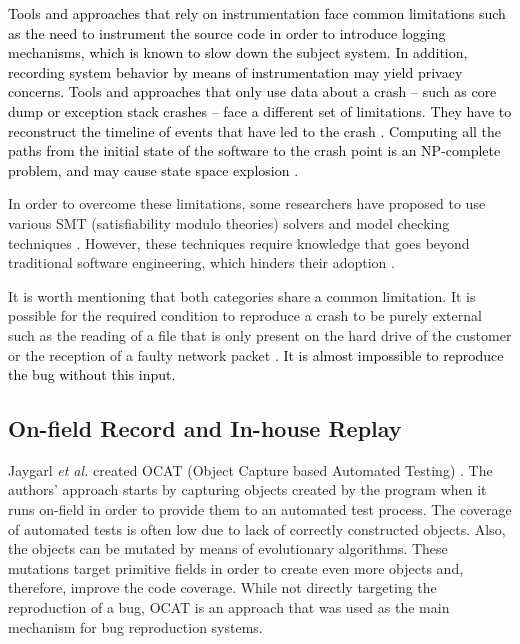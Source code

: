 \documentclass[times, doublespace]{smrauth}
\newcommand{\red}[1]{\textcolor{black}{#1}}
\begin{document}
\red{Tools and approaches that rely on instrumentation face common limitations such as the need to instrument the source code in order to introduce logging mechanisms\cite{Narayanasamy2005,Jaygarl,Artzi2008}, which is known to slow down the subject system.
In addition,  recording system behavior by means of instrumentation may yield privacy concerns.
Tools and approaches that only use data about a crash -- such as core dump or exception stack crashes -- face a different set of limitations. They have to reconstruct the timeline of events that have led to the crash \cite{Chen2013a,Nayrolles2015}. Computing all the paths from the initial state of the software to the crash point is an NP-complete problem, and may cause state space explosion \cite{Chen2013a,Clause2007}.}

In order to overcome these limitations, some researchers have proposed to
use various SMT (satisfiability modulo theories) solvers \cite{Dutertre2006}
and model checking techniques \cite{Visser2003}.
However, these techniques require knowledge that goes beyond traditional
software engineering, which hinders their adoption  \cite{Visser2004}.

It is worth mentioning that both categories share a common limitation.
It is possible for the required condition to reproduce a crash to be purely
external such as the reading of a file that is only present on the hard
drive of the customer or the reception of a faulty network packet
\cite{Chen2013a, Nayrolles2015}.
\red{It is almost impossible to reproduce the bug without this input.}



\subsection{On-field Record and In-house Replay}

Jaygarl {\it et al.} created OCAT (Object Capture based Automated Testing)
\cite{Jaygarl}.
The authors' approach starts by capturing objects created by the program when
it runs on-field in order to provide them to an automated test process.
The coverage of automated tests is often low due to lack of correctly
constructed objects. Also, the objects can be mutated by means of
evolutionary algorithms.
These mutations target primitive fields in order to create even more objects
and, therefore, improve the code coverage.
While not directly targeting the reproduction of a bug,
OCAT is an approach that was used as the main mechanism
for bug reproduction systems.
\end{document}

